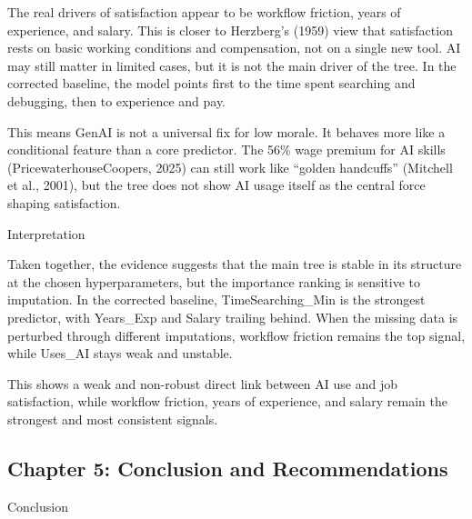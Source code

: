 \documentclass[
]{article}
\begin{document}
The real drivers of satisfaction appear to be workflow friction, years
of experience, and salary. This is closer to Herzberg's (1959) view that
satisfaction rests on basic working conditions and compensation, not on
a single new tool. AI may still matter in limited cases, but it is not
the main driver of the tree. In the corrected baseline, the model points
first to the time spent searching and debugging, then to experience and
pay.

This means GenAI is not a universal fix for low morale. It behaves more
like a conditional feature than a core predictor. The 56\% wage premium
for AI skills (PricewaterhouseCoopers, 2025) can still work like
``golden handcuffs'' (Mitchell et al., 2001), but the tree does not show
AI usage itself as the central force shaping satisfaction.

Interpretation

Taken together, the evidence suggests that the main tree is stable in
its structure at the chosen hyperparameters, but the importance ranking
is sensitive to imputation. In the corrected baseline,
TimeSearching\_Min is the strongest predictor, with Years\_Exp and
Salary trailing behind. When the missing data is perturbed through
different imputations, workflow friction remains the top signal, while
Uses\_AI stays weak and unstable.

This shows a weak and non-robust direct link between AI use and job
satisfaction, while workflow friction, years of experience, and salary
remain the strongest and most consistent signals.

\subsection{Chapter 5: Conclusion and
Recommendations}\label{chapter-5-conclusion-and-recommendations}

Conclusion
\end{document}
